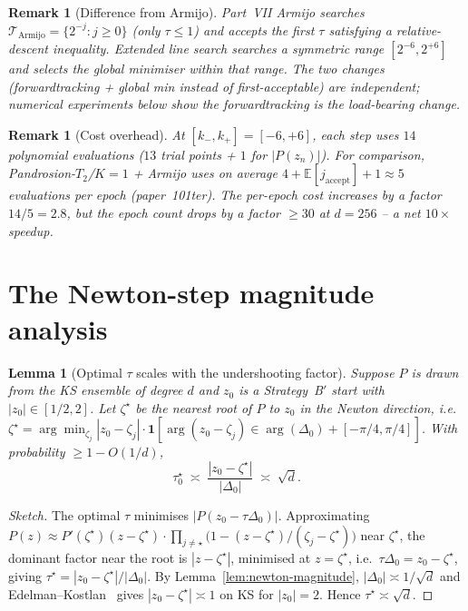 \documentclass[11pt,a4paper]{article}
\newtheorem{lemma}[theorem]{Lemma}
\newtheorem{remark}[theorem]{Remark}
\begin{document}
\begin{remark}[Difference from Armijo]
Part~VII Armijo searches $\mathcal{T}_{\text{Armijo}} = \{2^{-j} : j \ge 0\}$ (only $\tau \le 1$) and accepts the first $\tau$ satisfying a relative-descent inequality. Extended line search searches a symmetric range $[2^{-6}, 2^{+6}]$ and selects the global minimiser within that range. The two changes (forwardtracking + global min instead of first-acceptable) are independent; numerical experiments below show the forwardtracking is the load-bearing change.
\end{remark}

\begin{remark}[Cost overhead]
At $[k_-, k_+] = [-6, +6]$, each step uses $14$ polynomial evaluations ($13$ trial points + $1$ for $|P(z_n)|$). For comparison, Pandrosion-$T_2$/$K{=}1$ + Armijo uses on average $4 + \mathbb{E}[j_{\text{accept}}] + 1 \approx 5$ evaluations per epoch (paper~101ter). The per-epoch cost increases by a factor $14/5 = 2.8$, but the epoch count drops by a factor $\ge 30$ at $d = 256$ -- a net $10\times$ speedup.
\end{remark}

\section{The Newton-step magnitude analysis}\label{sec:newton-magnitude}

\begin{lemma}[Optimal $\tau$ scales with the undershooting factor]\label{lem:tau-optimal}
Suppose $P$ is drawn from the KS ensemble of degree $d$ and $z_0$ is a Strategy~B$'$ start with $|z_0| \in [1/2, 2]$. Let $\zeta^\star$ be the nearest root of $P$ to $z_0$ in the Newton direction, i.e.\ $\zeta^\star = \arg\min_{\zeta_j} |z_0 - \zeta_j| \cdot \mathbf{1}[\arg(z_0 - \zeta_j) \in \arg(\Delta_0) + [-\pi/4, \pi/4]]$. With probability $\ge 1 - O(1/d)$,
\begin{equation}\label{eq:tau-typical}
\tau^{\star}_0 \;\asymp\; \frac{|z_0 - \zeta^\star|}{|\Delta_0|} \;\asymp\; \sqrt{d}.
\end{equation}
\end{lemma}

\begin{proof}[Sketch]
The optimal $\tau$ minimises $|P(z_0 - \tau \Delta_0)|$. Approximating $P(z) \approx P'(\zeta^\star)(z - \zeta^\star) \cdot \prod_{j\ne\star}\!\bigl(1 - (z-\zeta^\star)/(\zeta_j - \zeta^\star)\bigr)$ near $\zeta^\star$, the dominant factor near the root is $|z - \zeta^\star|$, minimised at $z = \zeta^\star$, i.e.\ $\tau \Delta_0 = z_0 - \zeta^\star$, giving $\tau^\star = |z_0 - \zeta^\star|/|\Delta_0|$. By Lemma~\ref{lem:newton-magnitude}, $|\Delta_0| \asymp 1/\sqrt d$ and Edelman--Kostlan~\cite{edelmankostlan} gives $|z_0 - \zeta^\star| \asymp 1$ on KS for $|z_0| = 2$. Hence $\tau^\star \asymp \sqrt d$.
\end{proof}
\end{document}
